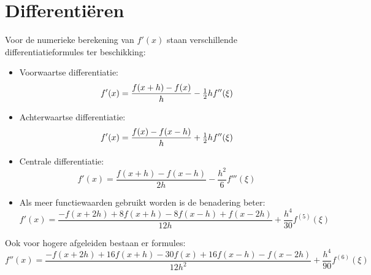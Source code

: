 \section{Differenti\"eren}
Voor de numerieke berekening van $f'(x)$ staan verschillende
differentiatieformules ter beschikking:
\begin{itemize}
\item Voorwaartse differentiatie:
\[
f'(x)=\frac{f(x+h)-f(x)}{h}-\mbox{$\frac{1}{2}$} hf''(\xi)
\]
\item Achterwaartse differentiatie:
\[
f'(x)=\frac{f(x)-f(x-h)}{h}+\mbox{$\frac{1}{2}$} hf''(\xi)
\]
\item Centrale differentiatie:
\[
f'(x)=\frac{f(x+h)-f(x-h)}{2h}-\frac{h^2}{6}f'''(\xi)
\]
\item Als meer functiewaarden gebruikt worden is de benadering beter:
\[
f'(x)=\frac{-f(x+2h)+8f(x+h)-8f(x-h)+f(x-2h)}{12h}+\frac{h^4}{30}f^{(5)}(\xi)
\]
\end{itemize}
Ook voor hogere afgeleiden bestaan er formules:
\[
f''(x)=\frac{-f(x+2h)+16f(x+h)-30f(x)+16f(x-h)-f(x-2h)}{12h^2}+\frac{h^4}{90}f^{(6)}(\xi)
\]

